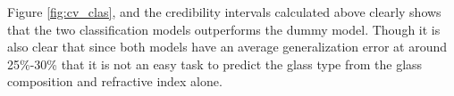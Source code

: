 Figure \ref{fig:cv_clas}, and the credibility intervals calculated above clearly shows that the two classification models outperforms the dummy model. Though it is also clear that since both models have an average generalization error at around 25\%-30\% that it is not an easy task to predict the glass type from the glass composition and refractive index alone. 